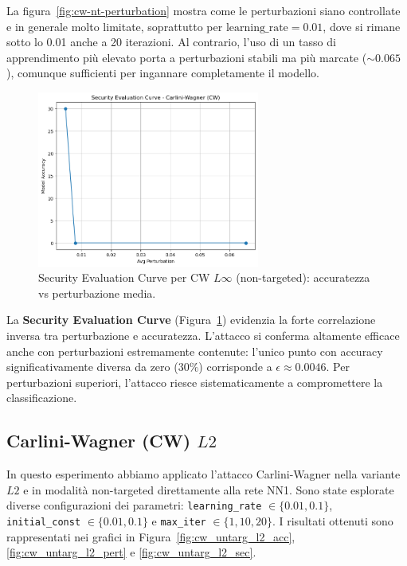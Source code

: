             \noindent La figura~\ref{fig:cw-nt-perturbation} mostra come le perturbazioni siano controllate e in generale molto limitate, soprattutto per $\text{learning\_rate} = 0.01$, dove si rimane sotto lo 0.01 anche a 20 iterazioni. Al contrario, l’uso di un tasso di apprendimento più elevato porta a perturbazioni stabili ma più marcate ($\sim 0.065$), comunque sufficienti per ingannare completamente il modello.
            
            \begin{figure}[H]
                \centering
                \includegraphics[width=0.65\textwidth]{images/cw_unt_ec.png}
                \caption{Security Evaluation Curve per CW $L\infty$ (non-targeted): accuratezza vs perturbazione media.}
                \label{fig:cw-nt-sec}
            \end{figure}
            
            \noindent La \textbf{Security Evaluation Curve} (Figura~\ref{fig:cw-nt-sec}) evidenzia la forte correlazione inversa tra perturbazione e accuratezza. L’attacco si conferma altamente efficace anche con perturbazioni estremamente contenute: l’unico punto con accuracy significativamente diversa da zero ($30\%$) corrisponde a $\epsilon \approx 0.0046$. Per perturbazioni superiori, l’attacco riesce sistematicamente a compromettere la classificazione.

        \subsection{Carlini-Wagner (CW) $L2$}
            In questo esperimento abbiamo applicato l'attacco Carlini-Wagner nella variante $L2$ e in modalità non-targeted direttamente alla rete NN1. Sono state esplorate diverse configurazioni dei parametri: \texttt{learning\_rate} $\in \{0.01, 0.1\}$, \texttt{initial\_const} $\in \{0.01, 0.1\}$ e \texttt{max\_iter} $\in \{1, 10, 20\}$. I risultati ottenuti sono rappresentati nei grafici in Figura~\ref{fig:cw_untarg_l2_acc}, \ref{fig:cw_untarg_l2_pert} e \ref{fig:cw_untarg_l2_sec}.
            

